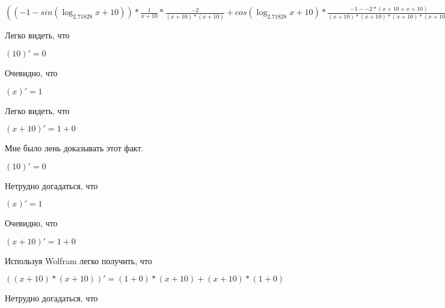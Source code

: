 \documentclass[12pt,a4paper,fleqn]{article}
\theoremstyle{definition}
\begin{document}
$(( -1  - sin(\log_{ 2.71828 }{ x  +  10 })) * \frac{ 1 }{ x  +  10 }
 * \frac{ -2 }{( x  +  10 ) * ( x  +  10 )}
 + cos(\log_{ 2.71828 }{ x  +  10 }) * \frac{ -1  -  -2  * ( x  +  10  +  x  +  10 )}{( x  +  10 ) * ( x  +  10 ) * ( x  +  10 ) * ( x  +  10 )}
)' = (( 0  - cos(\log_{ 2.71828 }{ x  +  10 }) * \frac{ 1  +  0 }{\log_{ 2.71828 }{ 2.71828 } * ( x  +  10 )}
) * \frac{ 1 }{ x  +  10 }
 + ( -1  - sin(\log_{ 2.71828 }{ x  +  10 })) * \frac{ 0  * ( x  +  10 ) -  1  * ( 1  +  0 )}{( x  +  10 ) * ( x  +  10 )}
) * \frac{ -2 }{( x  +  10 ) * ( x  +  10 )}
 + ( -1  - sin(\log_{ 2.71828 }{ x  +  10 })) * \frac{ 1 }{ x  +  10 }
 * \frac{ 0  * ( x  +  10 ) * ( x  +  10 ) -  -2  * (( 1  +  0 ) * ( x  +  10 ) + ( x  +  10 ) * ( 1  +  0 ))}{( x  +  10 ) * ( x  +  10 ) * ( x  +  10 ) * ( x  +  10 )}
 + ( -1  - sin(\log_{ 2.71828 }{ x  +  10 })) * \frac{ 1  +  0 }{\log_{ 2.71828 }{ 2.71828 } * ( x  +  10 )}
 * \frac{ -1  -  -2  * ( x  +  10  +  x  +  10 )}{( x  +  10 ) * ( x  +  10 ) * ( x  +  10 ) * ( x  +  10 )}
 + cos(\log_{ 2.71828 }{ x  +  10 }) * \frac{( 0  -  0  * ( x  +  10  +  x  +  10 ) +  -2  * ( 1  +  0  +  1  +  0 )) * ( x  +  10 ) * ( x  +  10 ) * ( x  +  10 ) * ( x  +  10 ) - ( -1  -  -2  * ( x  +  10  +  x  +  10 )) * ((( 1  +  0 ) * ( x  +  10 ) + ( x  +  10 ) * ( 1  +  0 )) * ( x  +  10 ) * ( x  +  10 ) + ( x  +  10 ) * ( x  +  10 ) * (( 1  +  0 ) * ( x  +  10 ) + ( x  +  10 ) * ( 1  +  0 )))}{( x  +  10 ) * ( x  +  10 ) * ( x  +  10 ) * ( x  +  10 ) * ( x  +  10 ) * ( x  +  10 ) * ( x  +  10 ) * ( x  +  10 )}
$

Легко видеть, что

$( 10 )' =  0 $

Очевидно, что

$( x )' =  1 $

Легко видеть, что

$( x  +  10 )' =  1  +  0 $

Мне было лень доказывать этот факт.

$( 10 )' =  0 $

Нетрудно догадаться, что

$( x )' =  1 $

Очевидно, что

$( x  +  10 )' =  1  +  0 $

Используя Wolfram легко получить, что

$(( x  +  10 ) * ( x  +  10 ))' = ( 1  +  0 ) * ( x  +  10 ) + ( x  +  10 ) * ( 1  +  0 )$

Нетрудно догадаться, что
\end{document}
